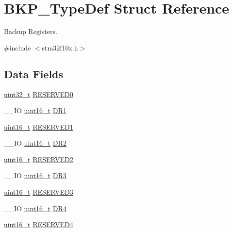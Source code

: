 \hypertarget{struct_b_k_p___type_def}{\section{B\-K\-P\-\_\-\-Type\-Def Struct Reference}
\label{struct_b_k_p___type_def}
}


Backup Registers.  




{\ttfamily \#include $<$stm32f10x.\-h$>$}

\subsection*{Data Fields}
\begin{DoxyCompactItemize}
\item 
\hyperlink{stdint_8h_a435d1572bf3f880d55459d9805097f62}{uint32\-\_\-t} \hyperlink{struct_b_k_p___type_def_a8b41b52d05011ff2ed2b85977ea20413}{R\-E\-S\-E\-R\-V\-E\-D0}
\item 
\-\_\-\-\_\-\-I\-O \hyperlink{stdint_8h_a273cf69d639a59973b6019625df33e30}{uint16\-\_\-t} \hyperlink{struct_b_k_p___type_def_aaa1a907c0aaf85c6de3aa3d829a07a3a}{D\-R1}
\item 
\hyperlink{stdint_8h_a273cf69d639a59973b6019625df33e30}{uint16\-\_\-t} \hyperlink{struct_b_k_p___type_def_a0d818c25d71abdfc33e9d3d905a0f5f2}{R\-E\-S\-E\-R\-V\-E\-D1}
\item 
\-\_\-\-\_\-\-I\-O \hyperlink{stdint_8h_a273cf69d639a59973b6019625df33e30}{uint16\-\_\-t} \hyperlink{struct_b_k_p___type_def_a98d088136a3ba92025a8381d9a19f7b0}{D\-R2}
\item 
\hyperlink{stdint_8h_a273cf69d639a59973b6019625df33e30}{uint16\-\_\-t} \hyperlink{struct_b_k_p___type_def_ae9cc232260bb14cfbdb0ecee85b2be50}{R\-E\-S\-E\-R\-V\-E\-D2}
\item 
\-\_\-\-\_\-\-I\-O \hyperlink{stdint_8h_a273cf69d639a59973b6019625df33e30}{uint16\-\_\-t} \hyperlink{struct_b_k_p___type_def_a034cf532a9752513de879c0f4ff38d0a}{D\-R3}
\item 
\hyperlink{stdint_8h_a273cf69d639a59973b6019625df33e30}{uint16\-\_\-t} \hyperlink{struct_b_k_p___type_def_a3a3f66ad2e85c6d29e9d282cf19d193e}{R\-E\-S\-E\-R\-V\-E\-D3}
\item 
\-\_\-\-\_\-\-I\-O \hyperlink{stdint_8h_a273cf69d639a59973b6019625df33e30}{uint16\-\_\-t} \hyperlink{struct_b_k_p___type_def_a02abe76a58a7f018ea450221c955ab30}{D\-R4}
\item 
\hyperlink{stdint_8h_a273cf69d639a59973b6019625df33e30}{uint16\-\_\-t} \hyperlink{struct_b_k_p___type_def_a1a74789e3a88f3bddf2e83673c5a6e2b}{R\-E\-S\-E\-R\-V\-E\-D4}

\end{DoxyCompactItemize}
